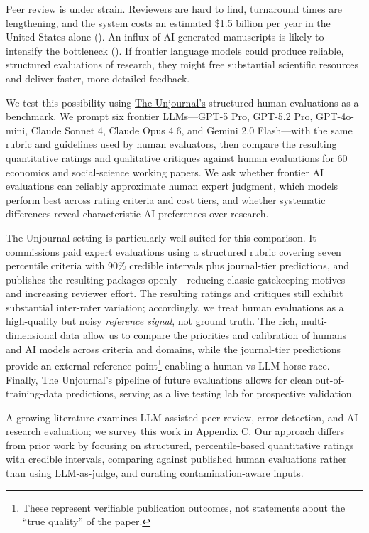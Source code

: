 \documentclass[
  11pt,
  letterpaper,
]{article}
\begin{document}
Peer review is under strain. Reviewers are hard to find, turnaround
times are lengthening, and the system costs an estimated \$1.5 billion
per year in the United States alone
(). An
influx of AI-generated manuscripts is likely to intensify the bottleneck
(). If frontier language models
could produce reliable, structured evaluations of research, they might
free substantial scientific resources and deliver faster, more detailed
feedback.

We test this possibility using \href{https://unjournal.org}{The
Unjournal's} structured human evaluations as a benchmark. We prompt six
frontier LLMs---GPT-5 Pro, GPT-5.2 Pro, GPT-4o-mini, Claude Sonnet 4,
Claude Opus 4.6, and Gemini 2.0 Flash---with the same rubric and
guidelines used by human evaluators, then compare the resulting
quantitative ratings and qualitative critiques against human evaluations
for 60 economics and social-science working papers. We ask whether
frontier AI evaluations can reliably approximate human expert judgment,
which models perform best across rating criteria and cost tiers, and
whether systematic differences reveal characteristic AI preferences over
research.

The Unjournal setting is particularly well suited for this comparison.
It commissions paid expert evaluations using a structured rubric
covering seven percentile criteria with 90\% credible intervals plus
journal-tier predictions, and publishes the resulting packages
openly---reducing classic gatekeeping motives and increasing reviewer
effort. The resulting ratings and critiques still exhibit substantial
inter-rater variation; accordingly, we treat human evaluations as a
high-quality but noisy \emph{reference signal}, not ground truth. The
rich, multi-dimensional data allow us to compare the priorities and
calibration of humans and AI models across criteria and domains, while
the journal-tier predictions provide an external reference
point\footnote{These represent verifiable publication outcomes, not
  statements about the ``true quality'' of the paper.} enabling a
human-vs-LLM horse race. Finally, The Unjournal's pipeline of future
evaluations allows for clean out-of-training-data predictions, serving
as a live testing lab for prospective validation.

A growing literature examines LLM-assisted peer review, error detection,
and AI research evaluation; we survey this work in
\hyperref[sec-related-work]{Appendix C}. Our approach differs from prior
work by focusing on structured, percentile-based quantitative ratings
with credible intervals, comparing against published human evaluations
rather than using LLM-as-judge, and curating contamination-aware inputs.
\end{document}

